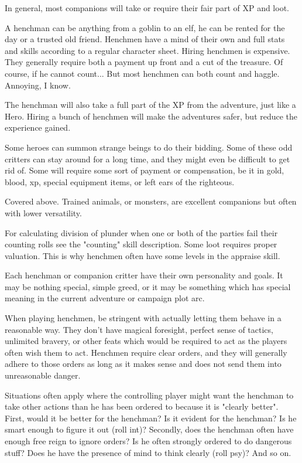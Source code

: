 In general, most companions will take or require their fair part of XP and loot.


\openitemslist

A henchman can be anything from a goblin to an elf, he can be rented for the day or a trusted old friend. Henchmen have a mind of their own and full stats and skills according to a regular character sheet.
Hiring henchmen is expensive. They generally require both a payment up front and a cut of the treasure. Of course, if he cannot count... But most henchmen can both count and haggle. Annoying, I know.

The henchman will also take a full part of the XP from the adventure, just like a Hero. Hiring a bunch of henchmen will make the adventures safer, but reduce the experience gained.


Some heroes can summon strange beings to do their bidding. Some of these odd critters can stay around for a long time, and they might even be difficult to get rid of. Some will require some sort of payment or compensation, be it in gold, blood, xp, special equipment items, or left ears of the righteous.


Covered above. Trained animals, or monsters, are excellent companions but often with lower versatility.

\closeitemslist


For calculating division of plunder when one or both of the parties fail their counting rolls see the "counting" skill description. Some loot requires proper valuation. This is why henchmen often have some levels in the appraise skill.

Each henchman or companion critter have their own personality and goals. It may be nothing special, simple greed, or it may be something which has special meaning in the current adventure or campaign plot arc.

When playing henchmen, be stringent with actually letting them behave in a reasonable way. They don't have magical foresight, perfect sense of tactics, unlimited bravery, or other feats which would be required to act as the players often wish them to act. Henchmen require clear orders, and they will generally adhere to those orders as long as it makes sense and does not send them into unreasonable danger.

Situations often apply where the controlling player might want the henchman to take other actions than he has been ordered to because it is "clearly better". First, would it be better for the henchman? Is it evident for the henchman? Is he smart enough to figure it out (roll int)? Secondly, does the henchman often have enough free reign to ignore orders? Is he often strongly ordered to do dangerous stuff? Does he have the presence of mind to think clearly (roll psy)? And so on.

